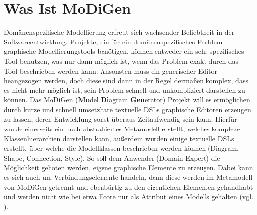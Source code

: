 \section{Was Ist MoDiGen}\label{modigen}
Domänenspezifische Modellierung erfreut sich wachsender Beliebtheit in der Softwareentwicklung. Projekte, die für ein domänenspezifisches Problem graphische Modellierungstools benötigen, können entweder ein sehr spezifisches Tool benutzen, was nur dann möglich ist, wenn das Problem exakt durch das Tool beschrieben werden kann. Ansonsten muss ein generischer Editor heangezogen werden, doch diese sind dann in der Regel dermaßen komplex, dass es nicht mehr möglich ist, sein Problem schnell und unkompliziert darstellen zu können. Das MoDiGen (\textbf{Mo}del \textbf{Di}agram \textbf{Gen}erator) Projekt will es ermöglichen durch kurze und schnell umsetzbare textuelle DSLs graphische Editoren erzeugen zu lassen, deren Entwicklung sonst überaus Zeitaufwendig sein kann. Hierfür wurde einerseits ein hoch abstrahiertes Metamodell erstellt, welches komplexe Klassenhierarchien darstellen kann, außerdem wurden einige textuelle DSLs erstellt, über welche die Modellklassen beschrieben werden können (Diagram, Shape, Connection, Style). So soll dem Anwender (Domain Expert) die Möglichkeit geboten werden, eigene graphische Elemente zu erzeugen. Dabei kann es sich auch um Verbindungselemente handeln, denn diese werden im Metamodell von MoDiGen getrennt und ebenbürtig zu den eigentichen Elementen gehandhabt und werden nicht wie bei etwa Ecore nur als Attribut eines Modells gehalten (vgl. \citet{gerhart:modigen_concept}).
